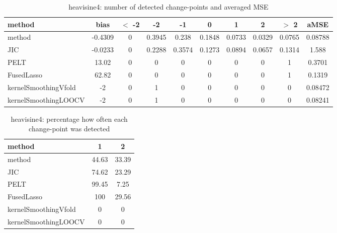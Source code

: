 \begin{table}[ht]
\centering
\begin{tabular}{l|c|ccccccc|c}
  \hline
method & bias & $<$ -2 & -2 & -1 & 0 & 1 & 2 & $>$ 2 & aMSE \\ 
  \hline
method & -0.4309 &     0 & 0.3945 & 0.238 & 0.1848 & 0.0733 & 0.0329 & 0.0765 & 0.08788 \\ 
  JIC & -0.0233 &     0 & 0.2288 & 0.3574 & 0.1273 & 0.0894 & 0.0657 & 0.1314 & 1.588 \\ 
  PELT & 13.02 &     0 &     0 &     0 &     0 &     0 &     0 &     1 & 0.3701 \\ 
  FusedLasso & 62.82 &     0 &     0 &     0 &     0 &     0 &     0 &     1 & 0.1319 \\ 
  kernelSmoothingVfold &    -2 &     0 &     1 &     0 &     0 &     0 &     0 &     0 & 0.08472 \\ 
  kernelSmoothingLOOCV &    -2 &     0 &     1 &     0 &     0 &     0 &     0 &     0 & 0.08241 \\ 
   \hline
\end{tabular}
\caption{heavisine4: number of detected change-points and averaged MSE} 
\label{tab:heavisine4Njumps}
\end{table}
\begin{table}[ht]
\centering
\begin{tabular}{l|cc}
  \hline
method & 1 & 2 \\ 
  \hline
method &  44.63 &  33.39 \\ 
  JIC &  74.62 &  23.29 \\ 
  PELT &  99.45 &   7.25 \\ 
  FusedLasso &    100 &  29.56 \\ 
  kernelSmoothingVfold &      0 &      0 \\ 
  kernelSmoothingLOOCV &      0 &      0 \\ 
   \hline
\end{tabular}
\caption{heavisine4: percentage how often each change-point was detected} 
\label{tab:heavisine4Detections}
\end{table}
